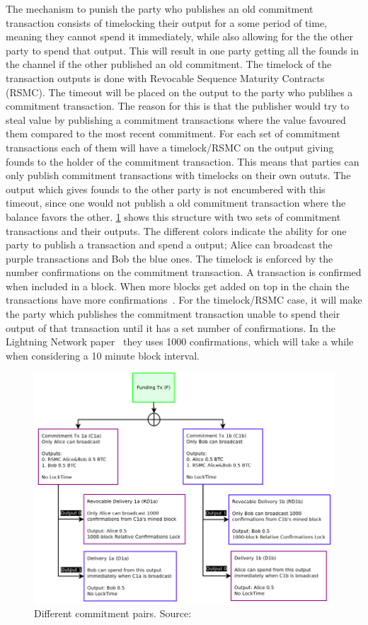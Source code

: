 The mechanism to punish the party who publishes an old commitment transaction consists of timelocking their output for a some period of time, meaning they cannot spend it immediately, while also allowing for the the other party to spend that output. 
This will result in one party getting all the founds in the channel if the other published an old commitment. The timelock of the transaction outputs is done with Revocable Sequence Maturity Contracts (RSMC). 
The timeout will be placed on the output to the party who publihes a commitment transaction. The reason for this is that the publisher would try to steal value by publishing a commitment transactions where the value favoured them compared to the most recent commitment. 
For each set of commitment transactions each of them will have a timelock/RSMC on the output giving founds to the holder of the commitment transaction. This means that parties can only publish commitment transactions with timelocks on their own oututs.
The output which gives founds to the other party is not encumbered with this timeout, since one would not publish a old commitment transaction where the balance favors the other. 
\cref{fig:ln_timeout} shows this structure with two sets of commitment transactions and their outputs. The different colors indicate the ability for one party to publish a transaction and spend a output; Alice can broadcast the purple transactions and Bob the blue ones. The timelock is enforced by the number confirmations on the commitment transaction. A transaction is confirmed when included in a block. When more blocks get added on top in the chain the transactions have more confirmations~\cite{antonopoulos2017mastering}. For the timelock/RSMC case, it will make the party which publishes the commitment transaction unable to spend their output of that transaction until it has a set number of confirmations. In the Lightning Network paper~\cite{poon2015bitcoin} they uses 1000 confirmations, which will take a while when considering a 10 minute block interval.
\\

\begin{figure}[ht]
    \centering
    \includegraphics[width=12cm]{figures/ln_timeout.png}
    \caption{Different commitment pairs. Source:~\cite{poon2015bitcoin}}
    \label{fig:ln_timeout}
\end{figure}

